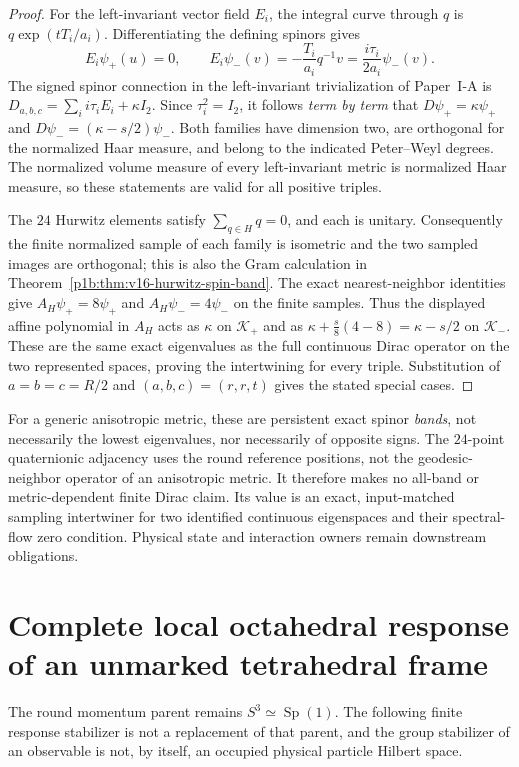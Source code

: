 \documentclass[11pt]{article}
\begin{document}
\begin{proof}
For the left-invariant vector field $E_i$, the integral curve through
$q$ is $q\exp(tT_i/a_i)$.  Differentiating the defining spinors gives
\[
  E_i\psi_+(u)=0,\qquad
  E_i\psi_-(v)=-\frac{T_i}{a_i}q^{-1}v
                  =\frac{i\tau_i}{2a_i}\psi_-(v).
\]
The signed spinor connection in the left-invariant trivialization
of Paper~I-A is
$D_{a,b,c}=\sum_i i\tau_iE_i+\kappa I_2$.
Since $\tau_i^2=I_2$, it follows \emph{term by term} that
$D\psi_+=\kappa\psi_+$ and
$D\psi_-=(\kappa-s/2)\psi_-$.
Both families have dimension two, are orthogonal for the normalized
Haar measure, and belong to the indicated Peter--Weyl degrees.
The normalized volume measure of every left-invariant metric is
normalized Haar measure, so these statements are valid for all
positive triples.

The $24$ Hurwitz elements satisfy $\sum_{q\in H}q=0$, and each is
unitary.  Consequently the finite normalized sample of each family
is isometric and the two sampled images are orthogonal; this is
also the Gram calculation in
Theorem~\ref{p1b:thm:v16-hurwitz-spin-band}.
The exact nearest-neighbor identities give
$A_H\psi_+=8\psi_+$ and $A_H\psi_-=4\psi_-$ on the finite samples.
Thus the displayed affine polynomial in $A_H$ acts as $\kappa$ on
$\mathscr K_+$ and as
$\kappa+\frac{s}{8}(4-8)=\kappa-s/2$ on
$\mathscr K_-$.  These are the same exact eigenvalues as the full
continuous Dirac operator on the two represented spaces, proving
the intertwining for every triple.  Substitution of
$a=b=c=R/2$ and $(a,b,c)=(r,r,t)$ gives the stated special cases.
\end{proof}
\begin{remark}
\label{p1b:rem:v17-aniso-spinor-scope}
For a generic anisotropic metric, these are persistent exact spinor
\emph{bands}, not necessarily the lowest eigenvalues, nor necessarily
of opposite signs.  The $24$-point quaternionic adjacency uses the
round reference positions, not the geodesic-neighbor operator of an
anisotropic metric.  It therefore makes no all-band or metric-dependent
finite Dirac claim.  Its value is an exact, input-matched sampling
intertwiner for two identified continuous eigenspaces and their
spectral-flow zero condition.  Physical state and interaction owners
remain downstream obligations.
\end{remark}


\section{Complete local octahedral response of an unmarked tetrahedral frame}
\label{p1b:sec:v18-complete-octahedral-response}
The round momentum parent remains $S^3\simeq\operatorname{Sp}(1)$.  The
following finite response stabilizer is not a replacement of that parent,
and the group stabilizer of an observable is not, by itself, an occupied
physical particle Hilbert space.
\end{document}
